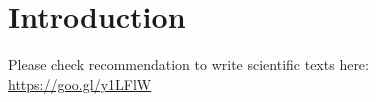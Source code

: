 \chapter{Introduction} 
%
Please check recommendation to write scientific texts here: \url{ https://goo.gl/y1LFlW}
